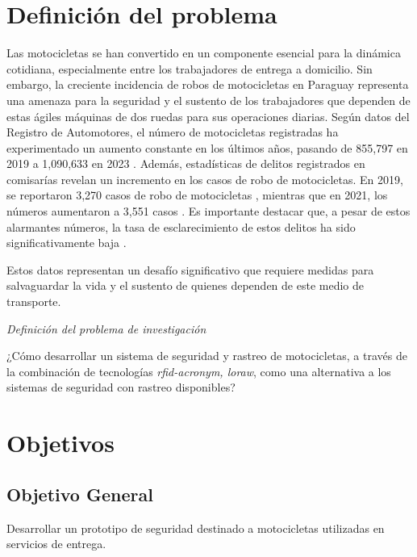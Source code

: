 \section{Definición del problema}
Las motocicletas se han convertido en un componente esencial para la dinámica cotidiana, especialmente entre los trabajadores de entrega a domicilio. Sin embargo, la creciente incidencia de robos de motocicletas en Paraguay representa una amenaza para la seguridad y el sustento de los trabajadores que dependen de estas ágiles máquinas de dos ruedas para sus operaciones diarias. Según datos del Registro de Automotores, el número de motocicletas registradas ha experimentado un aumento constante en los últimos años, pasando de 855,797 en 2019 a 1,090,633 en 2023 \cite{registro-automotores}. Además, estadísticas de delitos registrados en comisarías revelan un incremento en los casos de robo de motocicletas. En 2019, se reportaron 3,270 casos de robo de motocicletas \cite{anuario-estadistico-2019}, mientras que en 2021, los números aumentaron a 3,551 casos \cite{informeAnual2021}. Es importante destacar que, a pesar de estos alarmantes números, la tasa de esclarecimiento de estos delitos ha sido significativamente baja \cite{anuario-estadistico-2019}.

Estos datos representan un desafío significativo que requiere medidas para salvaguardar la vida y el sustento de quienes dependen de este medio de transporte.

\textit{Definición del problema de investigación}

¿Cómo desarrollar un sistema de seguridad y rastreo de motocicletas, a través de la combinación de tecnologías \textit{\acrshort{rfid-acronym}, \acrshort{loraw}}, como una alternativa a los sistemas de seguridad con rastreo disponibles?

\section{Objetivos}
\subsection{Objetivo General}
Desarrollar un prototipo de seguridad destinado a motocicletas utilizadas en servicios de entrega.

